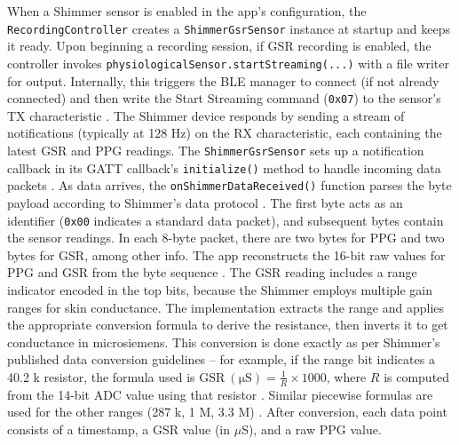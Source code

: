 When a Shimmer sensor is enabled in the app's configuration, the \texttt{RecordingController} creates a \texttt{ShimmerGsrSensor} instance at startup and keeps it ready. Upon beginning a recording session, if GSR recording is enabled, the controller invokes \texttt{physiologicalSensor.startStreaming(...)} with a file writer for output. Internally, this triggers the BLE manager to connect (if not already connected) and then write the Start Streaming command (\texttt{0x07}) to the sensor's TX characteristic \citep{ref15}. The Shimmer device responds by sending a stream of notifications (typically at 128 Hz) on the RX characteristic, each containing the latest GSR and PPG readings. The \texttt{ShimmerGsrSensor} sets up a notification callback in its GATT callback's \texttt{initialize()} method to handle incoming data packets \citep{ref15}. As data arrives, the \texttt{onShimmerDataReceived()} function parses the byte payload according to Shimmer's data protocol \citep{ref8}. The first byte acts as an identifier (\texttt{0x00} indicates a standard data packet), and subsequent bytes contain the sensor readings. In each 8-byte packet, there are two bytes for PPG and two bytes for GSR, among other info. The app reconstructs the 16-bit raw values for PPG and GSR from the byte sequence \citep{ref8}. The GSR reading includes a range indicator encoded in the top bits, because the Shimmer employs multiple gain ranges for skin conductance. The implementation extracts the range and applies the appropriate conversion formula to derive the resistance, then inverts it to get conductance in microsiemens. This conversion is done exactly as per Shimmer's published data conversion guidelines \citep{ref8} -- for example, if the range bit indicates a 40.2 k\Omega{} resistor, the formula used is $\mathrm{GSR\ (\mu S)} = \frac{1}{R} \times 1000$, where $R$ is computed from the 14-bit ADC value using that resistor \citep{ref8}. Similar piecewise formulas are used for the other ranges (287 k\Omega{}, 1 M\Omega{}, 3.3 M\Omega{}) \citep{ref8}. After conversion, each data point consists of a timestamp, a GSR value (in $\mu$S), and a raw PPG value.

